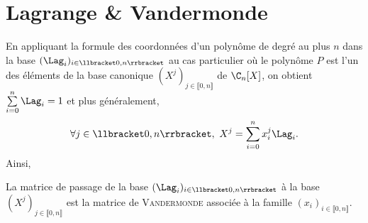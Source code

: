 \section{Lagrange \& Vandermonde}


En appliquant la formule des coordonnées d'un polynôme de degré au plus $n$ dans la base $(\Lag_i)_{i \in \llbracket 0, n \rrbracket}$ au cas particulier où le polynôme $P$ est l'un des éléments de la base canonique $(X^j)_{j \in \llbracket 0, n \rrbracket}$ de $\C_n[X]$, on obtient $\sum\limits_{i=0}^{n} \Lag_i = 1$ et plus généralement, 
$$\forall j \in \llbracket 0, n \rrbracket,\ X^j = \sum_{i=0}^{n} x_i ^j \Lag_i.$$
Ainsi, 
\begin{prop}{}
    La matrice de passage de la base  $(\Lag_i)_{i \in \llbracket 0, n \rrbracket}$ à la base  $(X^j)_{j \in \llbracket 0, n \rrbracket}$ est la matrice de \textsc{Vandermonde} associée à la famille $(x_i)_{i \in \llbracket 0, n \rrbracket}$.
\end{prop}
